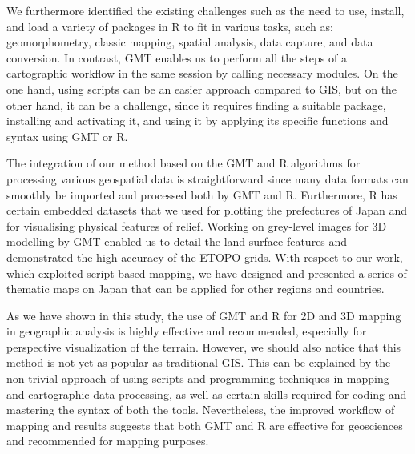 \documentclass[land,article,accept,pdftex,moreauthors]{Definitions/mdpi}
\begin{document}
We furthermore identified the existing challenges such as the need to use, install, and load a variety of packages in R to fit in various tasks{, such as}: geomorphometry, classic mapping, spatial analysis, data capture, {and} data conversion{. }In contrast, GMT enables us to perform all the steps of a cartographic workflow in the same session by calling necessary modules. On the one hand, using scripts can be an easier approach  compared to GIS, but on the other hand, it can be a challenge, since it requires finding a suitable package, installing and activating it, and using it by applying its specific functions and syntax using GMT or R. 

The integration of our method based on the GMT and R algorithms for processing various geospatial data is straightforward since many data formats can smoothly be imported and processed both by GMT and R. Furthermore, R has certain embedded datasets that we used for plotting the prefectures of Japan and for visualising physical features of relief. Working on grey-level images for 3D modelling by GMT enabled us to detail the land surface features and demonstrated the high accuracy of the ETOPO grids. With respect to our work, which exploited script-based mapping, we have designed and presented a series of thematic maps on Japan that can be applied for other regions and countries. 

As we {have }shown in this study, the use of GMT and R for 2D and 3D mapping in geographic analysis is highly effective and recommended, especially for perspective visualization of the terrain. However, we should also notice that this method is not yet as popular as traditional GIS. This can be explained by the non-trivial approach of using scripts and programming techniques in mapping and cartographic data processing, as well as certain skills required for coding and mastering the syntax of both the tools. Nevertheless, the improved workflow of mapping and results suggests that both GMT and R are effective for geosciences and{ }recommended for mapping purposes.

\vspace{6pt}

\end{document}
